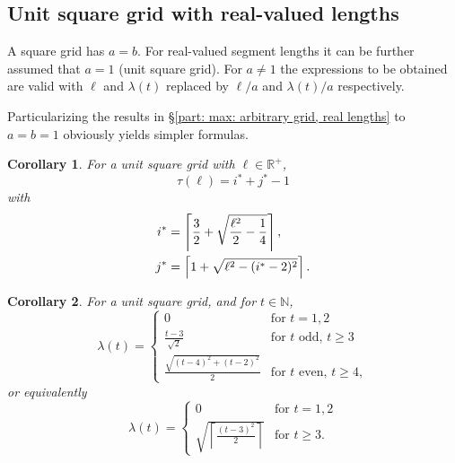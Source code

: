 \documentclass[12pt, a4paper]{article}
\let\Re\relax %
\DeclareMathOperator{\Re}{Re} %
\newcommand{\funt}{\tau} %
\newcommand{\funl}{\lambda} %
\newcommand{\len}{\ell} %
\newcommand{\tiles}{t} %
\newcommand{\isoli}{i^\ast}
\newcommand{\jsoli}{j^\ast}
\newtheorem{corollary}{Corollary}%
\begin{document}
\subsection{Unit square grid with real-valued lengths}
\label{part: max: unit square grid, real lengths}

A square grid has $a=b$. For real-valued segment lengths it can be further assumed that $a=1$ (unit square grid). For $a \neq 1$ the expressions to be obtained are valid with $\len$ and $\funl(\tiles)$ replaced by $\len/a$ and $\funl(\tiles)/a$ respectively.

Particularizing the results in \S\ref{part: max: arbitrary grid, real lengths} to $a=b=1$ obviously yields simpler formulas.

\begin{corollary}
\label{cor: funt, sq, form}
For a unit square grid with $\len \in \mathbb R^+$,
\begin{equation}
\label{eq: cor: funt, sq, form}
\funt(\len) = \isoli+\jsoli-1
\end{equation}
with
\begin{align}
\label{eq: cor: funt, sq, form; i}
\isoli &= \left\lceil \frac 3 2 + \Re\sqrt{\frac{\len^2}{2} - \frac 1 4} \right\rceil, \\
\label{eq: cor: funt, sq, form; j}
\jsoli &= \left\lceil 1 + \sqrt{\len^2-(\isoli-2)^2} \right\rceil.
\end{align}
\end{corollary}

\begin{corollary}
\label{theo: funl, sq, form}
For a unit square grid, and for $\tiles \in \mathbb N$,
\begin{equation}
\funl(\tiles) = \begin{cases}
\displaystyle
0 & \text{for } \tiles =1, 2 \\[1.4mm] %
\displaystyle
\frac{\tiles-3}{\sqrt{2}} & \text{for } \tiles \text{ odd, } \tiles \geq 3 \\[4.5mm] %
\displaystyle
\frac{\sqrt{(\tiles-4)^2+(\tiles-2)^2}} {2} & \text{for } \tiles \text{ even, } \tiles \geq 4,
\end{cases}
\end{equation}
or equivalently
\begin{equation}
\label{eq: theo: funt, sq, form; funl}
\funl(\tiles) = \begin{cases}
\displaystyle
0 & \text{for } \tiles =1, 2 \\[1.4mm]  %
\displaystyle
\sqrt{\left\lceil \frac{(\tiles-3)^2} {2} \right\rceil} & \text{for } \tiles \geq 3.
\end{cases}
\end{equation}
\end{corollary}
\end{document}
